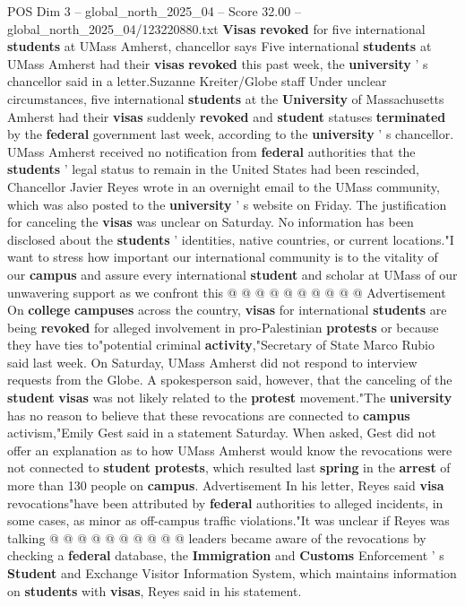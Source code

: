 \begin{textsample}{POS Dim 3 – global\_north\_2025\_04 – Score 32.00 – global\_north\_2025\_04/123220880.txt}  \label{ex:f3_pos_041}
\textbf{Visas} \textbf{revoked} for five international \textbf{students} at UMass Amherst, chancellor says Five international \textbf{students} at UMass Amherst had their \textbf{visas} \textbf{revoked} this past week, the \textbf{university} ' s chancellor said in a letter.Suzanne Kreiter/Globe staff Under unclear circumstances, five international \textbf{students} at the \textbf{University} of Massachusetts Amherst had their \textbf{visas} suddenly \textbf{revoked} and \textbf{student} statuses \textbf{terminated} by the \textbf{federal} government last week, according to the \textbf{university} ' s chancellor.
UMass Amherst received no notification from \textbf{federal} authorities that the \textbf{students} ' legal status to remain in the United States had been rescinded, Chancellor Javier Reyes wrote in an overnight email to the UMass community, which was also posted to the \textbf{university} ' s website on Friday.
The justification for canceling the \textbf{visas} was unclear on Saturday.
No information has been disclosed about the \textbf{students} ' identities, native countries, or current locations."I want to stress how important our international community is to the vitality of our \textbf{campus} and assure every international \textbf{student} and scholar at UMass of our unwavering support as we confront this @ @ @ @ @ @ @ @ @ @ Advertisement On \textbf{college} \textbf{campuses} across the country, \textbf{visas} for international \textbf{students} are being \textbf{revoked} for alleged involvement in pro-Palestinian \textbf{protests} or because they have ties to"potential criminal \textbf{activity},"Secretary of State Marco Rubio said last week.
On Saturday, UMass Amherst did not respond to interview requests from the Globe.
A spokesperson said, however, that the canceling of the \textbf{student} \textbf{visas} was not likely related to the \textbf{protest} movement."The \textbf{university} has no reason to believe that these revocations are connected to \textbf{campus} activism,"Emily Gest said in a statement Saturday.
When asked, Gest did not offer an explanation as to how UMass Amherst would know the revocations were not connected to \textbf{student} \textbf{protests}, which resulted last \textbf{spring} in the \textbf{arrest} of more than 130 people on \textbf{campus}.
Advertisement In his letter, Reyes said \textbf{visa} revocations"have been attributed by \textbf{federal} authorities to alleged incidents, in some cases, as minor as off-campus traffic violations."It was unclear if Reyes was talking @ @ @ @ @ @ @ @ @ @ leaders became aware of the revocations by checking a \textbf{federal} database, the \textbf{Immigration} and \textbf{Customs} Enforcement ' s \textbf{Student} and Exchange Visitor Information System, which maintains information on \textbf{students} with \textbf{visas}, Reyes said in his statement.

\end{textsample}
